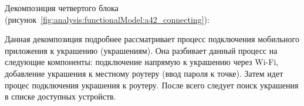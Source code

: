 Декомпозиция четвертого блока (рисунок~\ref{fig:analysis:functionalModel:a42_connecting}):

Данная декомпозиция подробнее рассматривает процесс подключения мобильного приложения к украшению (украшениям). Она разбивает данный процесс на следующие компоненты: подключение напрямую к украшению через Wi-Fi, добавление украшения к местному роутеру (ввод пароля к точке). Затем идет процес подключения украшения к роутеру. После всего следует поиск украшения в списке доступных устройств.